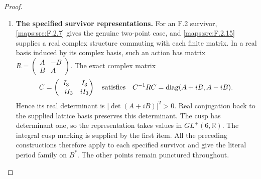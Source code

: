 \begin{proof}
\begin{enumerate}[label=\arabic*.]
For the local normalized period assertion, choose a local real
frame and let $\Lambda$ be its integer span in that chart; for an
integral representation retain the supplied lattice basis. Let
$\pi:\mathbb C^6\to E=\mathbb C^6/F$ be the actual quotient.
The images of the six real lattice basis vectors span $E$
over $\mathbb C$. Select three whose images are independent,
and let $P_\Lambda$ be the permutation matrix putting these
three first. In any local holomorphic frame of $E$, write
\[
 \pi P_\Lambda=[B,A],\qquad Z=B^{-1}A.
\]
The actual quotient coordinate change is left multiplication
by $B^{-1}$, and the normalized matrix is $[I_3,Z]$.
Its kernel, in this permuted lattice marking, is the graph
$\operatorname{im}\binom{-Z}{I_3}$. For real vectors $a,b$,
the real-coordinate map of the quotient is
\[
 \binom ab\longmapsto
 \begin{pmatrix}I_3&\operatorname{Re}Z\\0&\operatorname{Im}Z\end{pmatrix}
 \binom ab.
\]
It is invertible precisely when $\det\operatorname{Im}Z\ne0$;
its inverse sends $(r,s)$ to
$(r-\operatorname{Re}Z(\operatorname{Im}Z)^{-1}s,
 (\operatorname{Im}Z)^{-1}s)$.
The kernel graph satisfies
$\det(F,\overline F)=8i\det\operatorname{Im}Z$ in these
coordinates, consistent with its graph variable $-Z$.
The determinant factor of $P_\Lambda$ is retained by the
actual marking. Independence of the chosen three columns
persists locally, since $\det B$ remains nonzero.
This proves the asserted local period interpretation without
requiring one Grassmannian chart on the entire base.

\item \textbf{The specified survivor representations.}
For an F.2 survivor, \ref{maps:src:F.2.7} gives the genuine
two-point case, and \ref{maps:src:F.2.15} supplies a real
complex structure commuting with each finite matrix.
In a real basis induced by its complex basis, such an action
has matrix $R=\left(\begin{smallmatrix}A&-B\\B&A\end{smallmatrix}\right)$.
The exact complex matrix
\[
 C=\begin{pmatrix}I_3&I_3\\-iI_3&iI_3\end{pmatrix}
 \quad\hbox{satisfies}\quad
 C^{-1}RC=\operatorname{diag}(A+iB,A-iB).
\]
Hence its real determinant is $|\det(A+iB)|^2>0$.
Real conjugation back to the supplied lattice basis preserves
this determinant. The cusp has determinant one, so the
representation takes values in $GL^+(6,\mathbb R)$.
The integral cusp marking is supplied by the first item.
All the preceding constructions therefore apply to each
specified survivor and give the literal period family on
$B^*$. The other points remain punctured throughout.
\end{enumerate}
\end{proof}
